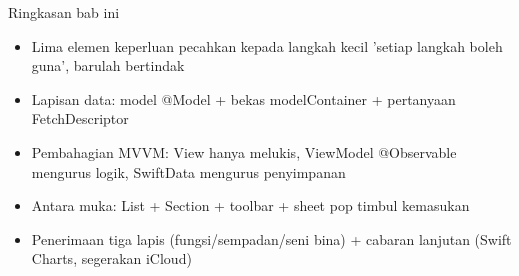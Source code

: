 \begin{tcbsummary}{Ringkasan bab ini}
\begin{itemize}
  \item Lima elemen keperluan pecahkan kepada langkah kecil 'setiap langkah boleh guna', barulah bertindak
  \item Lapisan data: model @Model + bekas modelContainer + pertanyaan FetchDescriptor
  \item Pembahagian MVVM: View hanya melukis, ViewModel @Observable mengurus logik, SwiftData mengurus penyimpanan
  \item Antara muka: List + Section + toolbar + sheet pop timbul kemasukan
  \item Penerimaan tiga lapis (fungsi/sempadan/seni bina) + cabaran lanjutan (Swift Charts, segerakan iCloud)
\end{itemize}

\end{tcbsummary}
